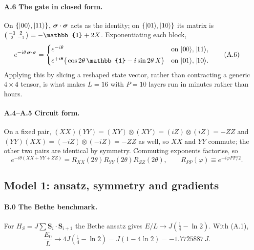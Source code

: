 \paragraph{\textsf{A.6} The gate in closed form.}
On $\{\lvert 00 \rangle,\lvert 11 \rangle\}$, $\bm{\sigma}\cdot\bm{\sigma}$ acts as the identity; on
$\{\lvert 01 \rangle,\lvert 10 \rangle\}$ its matrix is $\begin{psmallmatrix}-1&2\\2&-1\end{psmallmatrix}
= -\mathbb{1} + 2X$. Exponentiating each block,
\begin{equation}
  e^{-i\theta\,\ssig\cdot\ssig} =
  \begin{cases}
    e^{-i\theta} & \text{on } \ket{00},\ket{11},\\[2pt]
    e^{+i\theta}\big(\cos 2\theta\,\mathbb{1} - i\sin 2\theta\,X\big)
      & \text{on } \ket{01},\ket{10}.
  \end{cases}
  \tag{A.6}
\end{equation}
Applying this by slicing a reshaped state vector, rather than contracting a
generic $4\times4$ tensor, is what makes $L=16$ with $P=10$ layers run in
minutes rather than hours.

\paragraph{\textsf{A.4}--\textsf{A.5} Circuit form.}
On a fixed pair, $(XX)(YY) = (XY)\otimes(XY) = (iZ)\otimes(iZ) = -ZZ$ and
$(YY)(XX) = (-iZ)\otimes(-iZ) = -ZZ$ as well, so $XX$ and $YY$ commute; the
other two pairs are identical by symmetry. Commuting exponents factorise, so
\begin{equation}
  e^{-i\theta(XX+YY+ZZ)} = R_{XX}(2\theta)R_{YY}(2\theta)R_{ZZ}(2\theta),
  \qquad R_{PP}(\varphi) \equiv e^{-i\varphi PP/2}.
  \tag{A.5}
\end{equation}

\subsection{Model 1: ansatz, symmetry and gradients}

\paragraph{\textsf{B.0} The Bethe benchmark.}
For $H_S = J\sum \bm S_i\cdot\bm S_{i+1}$ the Bethe ansatz gives
$E/L \to J(\tfrac14 - \ln 2)$. With (A.1),
\begin{equation}
  \frac{E_0}{L} \longrightarrow 4J\left(\tfrac14-\ln 2\right)
  = J(1-4\ln 2) = -1.7725887\,J .
  \tag{B.0}
\end{equation}

